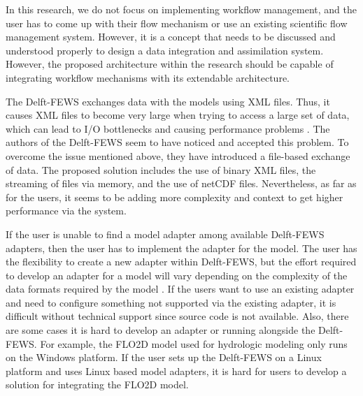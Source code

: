 In this research, we do not focus on implementing workflow management, and the user has to come up with their flow mechanism or use an existing scientific flow management system. However, it is a concept that needs to be discussed and understood properly to design a data integration and assimilation system. However, the proposed architecture within the research should be capable of integrating workflow mechanisms with its extendable architecture.

The Delft-FEWS exchanges data with the models using XML files. Thus, it causes XML files to become very large when trying to access a large set of data, which can lead to I/O bottlenecks and causing performance problems \cite{Werner2013TheSystem}. The authors of the Delft-FEWS \cite{Werner2013TheSystem} seem to have noticed and accepted this problem. To overcome the issue mentioned above, they have introduced a file-based exchange of data. The proposed solution includes the use of binary XML files, the streaming of files via memory, and the use of netCDF files. Nevertheless, as far as for the users, it seems to be adding more complexity and context to get higher performance via the system.

If the user is unable to find a model adapter among available Delft-FEWS adapters, then the user has to implement the adapter for the model. The user has the flexibility to create a new adapter within Delft-FEWS, but the effort required to develop an adapter for a model will vary depending on the complexity of the data formats required by the model \cite{Werner2013TheSystem}. If the users want to use an existing adapter and need to configure something not supported via the existing adapter, it is difficult without technical support since source code is not available. Also, there are some cases it is hard to develop an adapter or running alongside the Delft-FEWS. For example, the FLO2D model used for hydrologic modeling only runs on the Windows platform. If the user sets up the Delft-FEWS on a Linux platform and uses Linux based model adapters, it is hard for users to develop a solution for integrating the FLO2D model.
